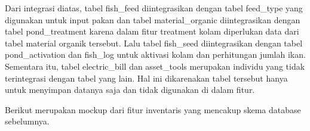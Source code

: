 \begin{enumerate}
\begin{enumerate}
		Dari integrasi diatas, tabel fish\_feed diintegrasikan dengan tabel feed\_type yang digunakan untuk input pakan dan tabel material\_organic diintegrasikan dengan tabel pond\_treatment karena dalam fitur treatment kolam diperlukan data dari tabel material organik tersebut. Lalu tabel fish\_seed diintegrasikan dengan tabel pond\_activation dan fish\_log untuk aktivasi kolam dan perhitungan jumlah ikan. Sementara itu, tabel electric\_bill dan asset\_tools merupakan individu yang tidak terintegrasi dengan tabel yang lain. Hal ini dikarenakan tabel tersebut hanya untuk menyimpan datanya saja dan tidak digunakan di dalam fitur.

		Berikut merupakan mockup dari fitur inventaris yang mencakup skema database sebelumnya.

		\begin{figure}[H]

\end{figure}
\end{enumerate}
\end{enumerate}
